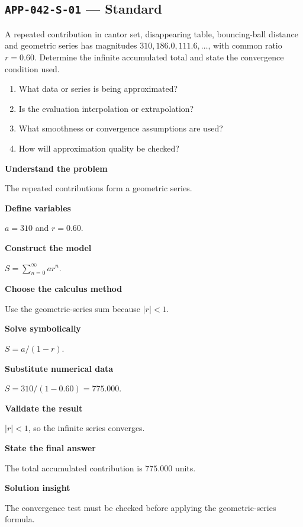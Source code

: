 \documentclass[11pt]{book}
\newcommand{\pid}[1]{\texttt{#1}}
\begin{document}
\subsection*{\pid{APP-042-S-01} — Standard}
\begin{problembox}
A repeated contribution in cantor set, disappearing table, bouncing-ball distance and geometric series has magnitudes $310, 186.0, 111.6,\ldots$, with common ratio $r=0.60$. Determine the infinite accumulated total and state the convergence condition used.
\end{problembox}
\begin{promptbox}\begin{enumerate}
\item What data or series is being approximated?
\item Is the evaluation interpolation or extrapolation?
\item What smoothness or convergence assumptions are used?
\item How will approximation quality be checked?
\end{enumerate}\end{promptbox}
\begin{solutionbox}
\textbf{Understand the problem}\par The repeated contributions form a geometric series.\par\medskip
\textbf{Define variables}\par $a=310$ and $r=0.60$.\par\medskip
\textbf{Construct the model}\par $S=\sum_{n=0}^{\infty}ar^n$.\par\medskip
\textbf{Choose the calculus method}\par Use the geometric-series sum because $|r|<1$.\par\medskip
\textbf{Solve symbolically}\par $S=a/(1-r)$.\par\medskip
\textbf{Substitute numerical data}\par $S=310/(1-0.60)=775.000$.\par\medskip
\textbf{Validate the result}\par $|r|<1$, so the infinite series converges.\par\medskip
\textbf{State the final answer}\par The total accumulated contribution is $775.000$ units.\par\medskip
\textbf{Solution insight}\par The convergence test must be checked before applying the geometric-series formula.\par\medskip
\end{solutionbox}
\end{document}
